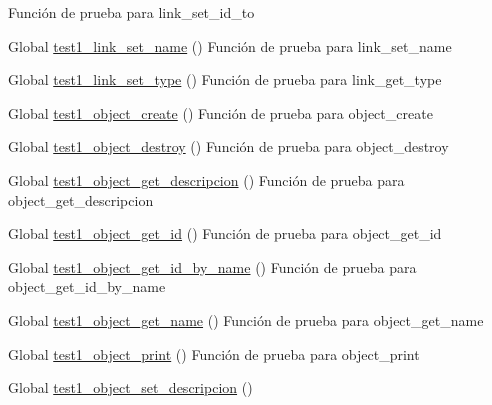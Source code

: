 \begin{DoxyRefList}
%
Función de prueba para link\+\_\+set\+\_\+id\+\_\+to  
\item[Global \mbox{\hyperlink{link__test_8c_ae0e478a0540bed26befc071591e3ff6c}{test1\+\_\+link\+\_\+set\+\_\+name}} ()]\label{test__test000081}%
%
Función de prueba para link\+\_\+set\+\_\+name  
\item[Global \mbox{\hyperlink{link__test_8c_a4cc1e4af5b00042089379c6d2236f8e8}{test1\+\_\+link\+\_\+set\+\_\+type}} ()]\label{test__test000096}%
%
Función de prueba para link\+\_\+get\+\_\+type  
\item[Global \mbox{\hyperlink{object__test_8c_a3836d69f92ce7149d56bafcaec83f516}{test1\+\_\+object\+\_\+create}} ()]\label{test__test000101}%
%
Función de prueba para object\+\_\+create  
\item[Global \mbox{\hyperlink{object__test_8c_a498384b62d11142a84e4a95bc12c42bc}{test1\+\_\+object\+\_\+destroy}} ()]\label{test__test000103}%
%
Función de prueba para object\+\_\+destroy  
\item[Global \mbox{\hyperlink{object__test_8c_add91560989a3b9cada34364a6abd7ac3}{test1\+\_\+object\+\_\+get\+\_\+descripcion}} ()]\label{test__test000114}%
%
Función de prueba para object\+\_\+get\+\_\+descripcion  
\item[Global \mbox{\hyperlink{object__test_8c_aa88e9e9dab92ba9c58851d7a7a8415f0}{test1\+\_\+object\+\_\+get\+\_\+id}} ()]\label{test__test000105}%
%
Función de prueba para object\+\_\+get\+\_\+id  
\item[Global \mbox{\hyperlink{object__test_8c_a2a113343f259d92142fde75b9c04c4df}{test1\+\_\+object\+\_\+get\+\_\+id\+\_\+by\+\_\+name}} ()]\label{test__test000119}%
%
Función de prueba para object\+\_\+get\+\_\+id\+\_\+by\+\_\+name  
\item[Global \mbox{\hyperlink{object__test_8c_ad2411bc3cc47c9905e63a3d9c561d369}{test1\+\_\+object\+\_\+get\+\_\+name}} ()]\label{test__test000112}%
%
Función de prueba para object\+\_\+get\+\_\+name  
\item[Global \mbox{\hyperlink{object__test_8c_a30b89e40f10485eea39398a21f5a4441}{test1\+\_\+object\+\_\+print}} ()]\label{test__test000122}%
%
Función de prueba para object\+\_\+print  
\item[Global \mbox{\hyperlink{object__test_8c_a0f107a04ebae63bc02b8281374b1e94c}{test1\+\_\+object\+\_\+set\+\_\+descripcion}} ()]\label{test__test000116}%

\end{DoxyRefList}
